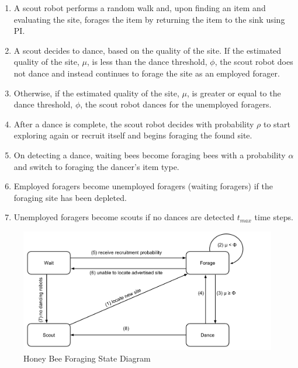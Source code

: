 \begin{enumerate}

\item A scout robot performs a random walk and, upon finding an item and evaluating the site, forages the item by returning the item to the sink using PI. 

\item A scout decides to dance, based on the quality of the site. If the estimated quality of the site, $\mu$, is less than the dance threshold, $\phi$, the scout robot does not dance and instead continues to forage the site as an employed forager.

\item Otherwise, if the estimated quality of the site, $\mu$, is greater or equal to the dance threshold, $\phi$, the scout robot dances for the unemployed foragers.

\item After a dance is complete, the scout robot decides with probability $\rho$ to start exploring again or recruit itself and begins foraging the found site.

\item On detecting a dance, waiting bees become foraging bees with a probability $\alpha$ and switch to foraging the dancer's item type.

\item Employed foragers become unemployed foragers (waiting foragers) if the foraging site has been depleted.

\item Unemployed foragers become scouts if no dances are detected $t_{max}$ time steps.

\end{enumerate}

\begin{figure}[h]
	\centering
	\includegraphics[width=\textwidth]{chapters/chapter3/figures/HoneyBee.pdf}
	\caption{Honey Bee Foraging State Diagram }
	\label{honeybeestate}
\end{figure}

